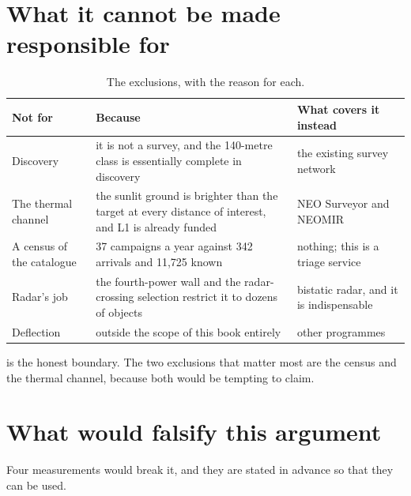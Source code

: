 \section{What it cannot be made responsible for}

\begin{table}[!htbp]
\centering
\small
\caption{The exclusions, with the reason for each.}
\label{tab:exclusions}
\begin{tabularx}{\textwidth}{@{}P{1.41in}P{1.15in}Y@{}}
\toprule
{}
\textbf{Not for} & \textbf{Because} & \textbf{What covers it instead} \\
\midrule
Discovery & it is not a survey, and the 140-metre class is essentially
complete in discovery & the existing survey network \\
The thermal channel & the sunlit ground is brighter than the target at
every distance of interest, and L1 is already funded & NEO Surveyor and
NEOMIR \\
A census of the catalogue & 37 campaigns a year against 342 arrivals and
11,725 known & nothing; this is a triage service \\
Radar's job & the fourth-power wall and the radar-crossing selection
restrict it to dozens of objects & bistatic radar, and it is indispensable \\
Deflection & outside the scope of this book entirely & other programmes \\
\bottomrule
\end{tabularx}
\end{table}

 is the honest boundary. The two exclusions that
matter most are the census and the thermal channel, because both would be
tempting to claim.

\section{What would falsify this argument}

Four measurements would break it, and they are stated in advance so that
they can be used.

